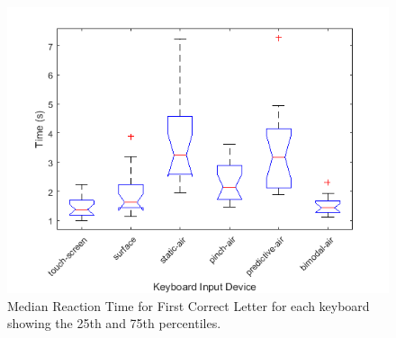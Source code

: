 \begin{figure}[t]
	\centering
	\includegraphics{Figures/fig_reaction_pressed_boxplot}
	\caption[Reaction Time for First Correct Letter Boxplot]{Median Reaction Time for First Correct Letter for each keyboard showing the 25th and 75th percentiles.}
	\label{fig_reaction_pressed_boxplot}
\end{figure}

